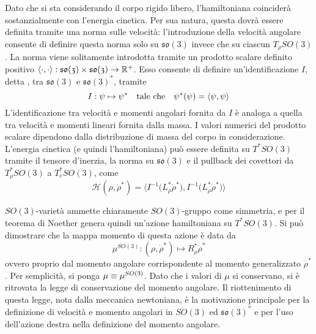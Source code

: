 Dato che si sta considerando il corpo rigido libero, l'hamiltoniana coinciderà sostanzialmente con l'energia cinetica. Per sua natura, questa dovrà essere definita tramite una norma sulle velocità: l'introduzione della velocità angolare consente di definire questa norma solo su $\mathfrak{so(3)}$ invece che su ciascun $T_{\rho}SO(3)$. La norma viene solitamente introdotta tramite un prodotto scalare definito positivo $\langle \cdot, \cdot\rangle: \mathfrak{so(3)} \times  \mathfrak{so(3)} \to \mathbb{R}^+$. Esso consente di definire un'identificazione $I$, detta , tra $\mathfrak{so(3)}$ e $\mathfrak{so(3)}^*$, tramite
\begin{equation*}
I: \psi \mapsto \psi^* \qqtext{tale che} \psi^* (\psi) = \langle \psi, \psi \rangle
\end{equation*} 
L'identificazione tra velocità e momenti angolari fornita da $I$ è analoga a quella tra velocità e momenti lineari fornita dalla massa. I valori numerici del prodotto scalare dipendono dalla distribuzione di massa del corpo in considerazione. L'energia cinetica (e quindi l'hamiltoniana) può essere definita su $T^* SO(3)$ tramite il tensore d'inerzia, la norma su $\mathfrak{so(3)}$ e il pullback dei covettori da $T^*_{\rho}SO(3)$ a $T^*_{e}SO(3)$, come
\begin{equation*}
\mathcal{H}(\rho, \dot{\rho}^*) = \Big\langle I^{-1}\big(L^*_\rho \dot{\rho}^*\big), I^{-1}\big(L^*_\rho \dot{\rho}^*\big) \Big\rangle
\end{equation*}

$SO(3)$-varietà ammette chiaramente $SO(3)$-gruppo come simmetria, e per il teorema di Noether genera quindi un'azione hamiltoniana su $T^*SO(3)$. Si può dimostrare che la mappa momento di questa azione è data da 
\begin{equation*}
\mu^{SO(3)}: (\rho, \dot{\rho}^*) \longmapsto R_{\rho}^* \dot{\rho}^* 
\end{equation*}
ovvero proprio dal momento angolare corrispondente al momento generalizzato $\dot{\rho}^*$. Per semplicità, si ponga $\mu \equiv \mu^{SO(3)}$. Dato che i valori di $\mu$ si conservano, si è ritrovata la legge di conservazione del momento angolare. Il riottenimento di questa legge, nota dalla meccanica newtoniana, è la motivazione principale per la definizione di velocità e momento angolari in $SO(3)$ ed $\mathfrak{so(3)}^*$ e per l'uso dell'azione destra nella definizione del momento angolare.

